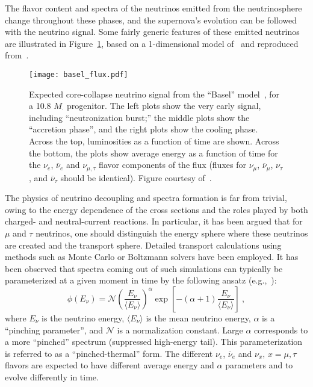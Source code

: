 The flavor content and spectra of the neutrinos emitted from the neutrinosphere change
throughout these phases, and the supernova's evolution can
be followed with the neutrino signal. %
Some fairly generic features of these emitted neutrinos are illustrated in Figure~\ref{fig:spectrum}, based on a 1-dimensional model of~\cite{Fischer:2009af} and reproduced from~\cite{Wurm:2011zn}.
%
\begin{figure}[!htb]
\centering
\texttt{[image: basel\_flux.pdf]}
\caption[Expected core-collapse neutrino signal]{Expected
  core-collapse neutrino signal from the ``Basel''
  model~\cite{Fischer:2009af}, for a
  10.8 $M_{\cdot}$ progenitor.  The left plots show the very early
  signal, including ``neutronization burst;'' the middle plots show
  the ``accretion phase'', and the right plots show the cooling
  phase. Across the top, luminosities as a function of time are shown. 
  Across the bottom, the plots show average energy as a function of time for the
  $\nu_e$, $\overline{\nu}_e$ and $\nu_{\mu,\tau}$ flavor components of the
  flux (fluxes for $\nu_\mu$, $\overline{\nu}_\mu$, $\nu_\tau$,
  and $\overline{\nu}_\tau$ should be identical).  Figure courtesy of~\cite{Wurm:2011zn}.}
\label{fig:spectrum}
\end{figure}

The physics of neutrino decoupling and spectra formation is far from trivial, owing to the energy dependence of the cross sections and the roles played by both charged- and neutral-current reactions. In particular, it has been argued that for $\mu$ and $\tau$ neutrinos, one should distinguish the energy sphere where these neutrinos are created and the transport sphere. Detailed transport calculations using methods such as Monte Carlo or Boltzmann solvers have been employed. It has been observed that spectra coming out of such simulations can typically be parameterized at a given moment in time by the following ansatz (e.g.,~\cite{Minakata:2008nc,Tamborra:2012ac}):
\begin{equation}
        \label{eq:pinched}
        \phi(E_{\nu}) = \mathcal{N} 
        \left(\frac{E_{\nu}}{\langle E_{\nu} \rangle}\right)^{\alpha} \exp\left[-\left(\alpha + 1\right)\frac{E_{\nu}}{\langle E_{\nu} \rangle}\right] \ ,
\end{equation}
where $E_{\nu}$ is the neutrino energy, $\langle E_\nu \rangle$ is the
mean neutrino energy, $\alpha$ is a ``pinching parameter'', and
$\mathcal{N}$ is a normalization constant.
%
Large $\alpha$ corresponds to a more ``pinched'' spectrum (suppressed
high-energy tail). This parameterization is referred to as a
``pinched-thermal'' form. The different $\nu_e$, $\overline{\nu}_e$ and
$\nu_x, \, x = \mu, \tau$ flavors are expected to have different
average energy and $\alpha$ parameters and to evolve differently in
time. 

